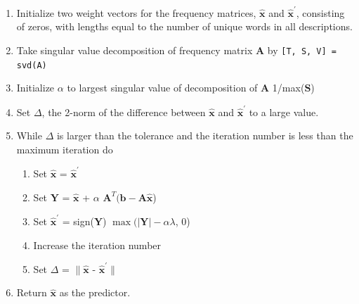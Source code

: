 \documentclass[12pt]{article}
\begin{document}
    \begin{minipage}{35em}

        \begin{enumerate}
            
            \item Initialize two weight vectors for the frequency matrices,
                $\hat{\bm{x}}$ and $\hat{\bm{x}}^\prime$, consisting of zeros,
                with lengths equal to the number of unique words in all
                descriptions.

            \item Take singular value decomposition of frequency matrix
                $\bm{A}$ by \texttt{[T, S, V] = svd(A)}

            \item Initialize $\alpha$ to largest singular value of
                decomposition of $\bm{A}$ 1/max($\bm{S}$)

            \item Set $\Delta$, the 2-norm of the difference between
                $\hat{\bm{x}}$ and $\hat{\bm{x}}^\prime$ to a large value.
                
            \item While $\Delta$ is larger than the tolerance and the iteration
                number is less than the maximum iteration do

                \begin{enumerate}

                    \item Set $\hat{\bm{x}}$ = $\hat{\bm{x}}^\prime$
                    
                    \item Set $\bm{Y}$ = $\hat{\bm{x}}$ + $\alpha$ $\bm{A}^T
                        (\bm{b - A} \hat{\bm{x}}$)

                    \item Set $\hat{\bm{x}}^\prime$ = sign($\bm{Y}$)
                        $\max(|\bm{Y}| - \alpha \lambda$, 0)

                    \item Increase the iteration number

                    \item Set $\Delta$ = $\|\hat{\bm{x}}$ -
                        $\hat{\bm{x}}^\prime\|$

                \end{enumerate}

            \item Return $\hat{\bm{x}}$ as the predictor.

        \end{enumerate}
    \end{minipage}
\end{document}

